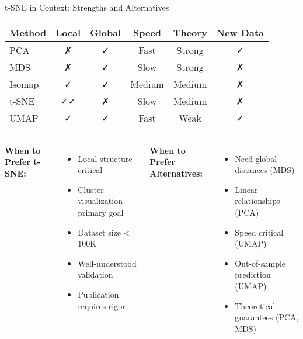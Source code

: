 \documentclass[aspectratio=169]{beamer}
\begin{document}
\begin{frame}{t-SNE in Context: Strengths and Alternatives}
\begin{center}
\begin{tabular}{l|c|c|c|c|c}
\textbf{Method} & \textbf{Local} & \textbf{Global} & \textbf{Speed} & \textbf{Theory} & \textbf{New Data}\\
\hline
PCA & ✗ & ✓ & Fast & Strong & ✓\\
MDS & ✗ & ✓ & Slow & Strong & ✗\\
Isomap & ✓ & ✓ & Medium & Medium & ✗\\
t-SNE & ✓✓ & ✗ & Slow & Medium & ✗\\
UMAP & ✓ & ✓ & Fast & Weak & ✓\\
\end{tabular}
\end{center}

\vspace{0.3cm}
\begin{columns}
\textbf{When to Prefer t-SNE:}
\begin{itemize}
\item Local structure critical
\item Cluster visualization primary goal
\item Dataset size < 100K
\item Well-understood validation
\item Publication requires rigor
\end{itemize}

\textbf{When to Prefer Alternatives:}
\begin{itemize}
\item Need global distances (MDS)
\item Linear relationships (PCA)
\item Speed critical (UMAP)
\item Out-of-sample prediction (UMAP)
\item Theoretical guarantees (PCA, MDS)
\end{itemize}

\end{columns}
\end{frame}
\end{document}
